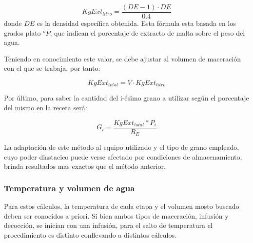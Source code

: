 \begin{itemize}
                    \begin{equation}
                        KgExt_{litro} = \frac{(DE-1) \cdot DE}{0.4}
                    \end{equation}
                    donde $DE$ es la densidad específica obtenida. Esta fórmula esta basada en los grados plato °$P$, que indican el porcentaje de extracto de malta sobre el peso del agua.
                    
                    \par Teniendo en conocimiento este valor, se debe ajustar al volumen de maceración con el que se trabaja, por tanto:
                    
                    \begin{equation}
                        KgExt_{total} = V \cdot KgExt_{litro}
                    \end{equation}
                    
                    \par Por último, para saber la cantidad del i-ésimo grano a utilizar según el porcentaje del mismo en la receta será:
                    
                    \begin{equation}
                        G_{i} = \frac{KgExt_{total} * P_{i}}{R_E}
                    \end{equation}
                    
                    \par La adaptación de este método al equipo utilizado y el tipo de grano empleado, cuyo poder diastacico puede verse afectado por condiciones de almacenamiento, brinda resultados mas exactos que el método anterior.
                \end{itemize}
                
            \subsubsection{Temperatura y volumen de agua}
            \par Para estos cálculos, la temperatura de cada etapa y el volumen mosto buscado deben ser conocidos a priori. Si bien ambos tipos de maceración, infusión y decocción, se inician con una infusión, para el salto de temperatura el procedimiento es distinto conllevando a distintos cálculos.
            
